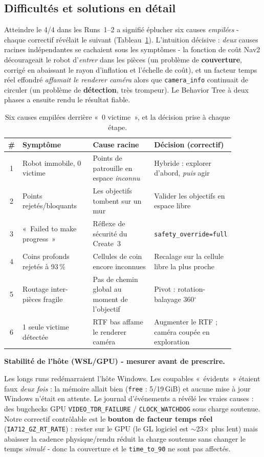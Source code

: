\documentclass[11pt,a4paper]{article}
\newcommand{\head}[1]{\par\smallskip\noindent\textbf{\color{nccblue}#1}\par}
\begin{document}
\subsection*{Difficultés et solutions en détail}
Atteindre le 4/4 dans les Runs~1--2 a signifié éplucher six causes \emph{empilées} - chaque correctif
révélait le suivant (Tableau~\ref{tab:bugs}). L'intuition décisive : \emph{deux} causes racines
indépendantes se cachaient sous les symptômes - la fonction de coût Nav2 décourageait le robot d'\emph{entrer}
dans les pièces (un problème de \textbf{couverture}, corrigé en abaissant le rayon d'inflation et l'échelle
de coût), et un facteur temps réel effondré \emph{affamait le renderer caméra} alors que
\texttt{camera\_info} continuait de circuler (un problème de \textbf{détection}, très trompeur). Le
Behavior Tree à deux phases a ensuite rendu le résultat fiable.

\begin{table}[htbp]\centering\footnotesize
\begin{tabular}{@{}cp{0.31\linewidth}p{0.27\linewidth}p{0.30\linewidth}@{}}
\toprule
\# & Symptôme & Cause racine & Décision (correctif)\\
\midrule
1 & Robot immobile, 0 victime & Points de patrouille en espace \emph{inconnu} & Hybride : explorer d'abord, \emph{puis} agir\\
2 & Points rejetés/bloquants & Les objectifs tombent sur un mur & Valider les objectifs en espace libre\\
3 & «~Failed to make progress~» & Réflexe de sécurité du Create~3 & \texttt{safety\_override=full}\\
4 & Coins profonds rejetés à 93\,\% & Cellules de coin encore inconnues & Recalage sur la cellule libre la plus proche\\
5 & Routage inter-pièces fragile & Pas de chemin global au moment de l'objectif & Pivot : rotation-balayage 360$^\circ$\\
6 & 1 seule victime détectée & RTF bas affame le renderer caméra & Augmenter le RTF ; caméra coupée en exploration\\
\bottomrule
\end{tabular}
\caption{Six causes empilées derrière «~0 victime~», et la décision prise à chaque étape.}
\label{tab:bugs}
\end{table}

\head{Stabilité de l'hôte (WSL/GPU) - mesurer avant de prescrire.} Les longs runs redémarraient l'hôte
Windows. Les coupables «~évidents~» étaient faux \emph{deux fois} : la mémoire allait bien (\texttt{free} :
5/19\,GiB) et aucune mise à jour Windows n'était en attente. Le journal d'événements a révélé les vraies
causes : des bugchecks GPU \texttt{VIDEO\_TDR\_FAILURE} / \texttt{CLOCK\_WATCHDOG} sous charge soutenue.
Notre correctif contrôlable est le \textbf{bouton de facteur temps réel} (\texttt{IA712\_GZ\_RT\_RATE}) :
rester sur le GPU (le GL logiciel est $\sim$23$\times$ plus lent) mais abaisser la cadence
physique/rendu réduit la charge soutenue sans changer le temps \emph{simulé} - donc la couverture et le
\texttt{time\_to\_90} ne sont pas affectés.
\end{document}
